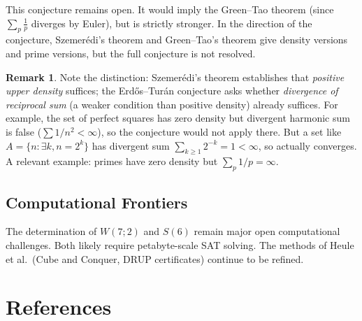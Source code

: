 \documentclass[12pt,a4paper]{amsart}
\theoremstyle{definition}
\newtheorem{remark}[theorem]{Remark}
\begin{document}
This conjecture remains open. It would imply the Green--Tao theorem (since $\sum_{p}
\frac{1}{p}$ diverges by Euler), but is strictly stronger. In the direction of the
conjecture, Szemer\'edi's theorem and Green--Tao's theorem give density versions and
prime versions, but the full conjecture is not resolved.

\begin{remark}
Note the distinction: Szemer\'edi's theorem establishes that \emph{positive upper density}
suffices; the Erd\H{o}s--Tur\'an conjecture asks whether \emph{divergence of reciprocal
sum} (a weaker condition than positive density) already suffices. For example, the set
of perfect squares has zero density but divergent harmonic sum is false
($\sum 1/n^2 < \infty$), so the conjecture would not apply there. But a set like
$A = \{n : \exists k, n = 2^k\}$ has divergent sum $\sum_{k\geq 1} 2^{-k} = 1 < \infty$,
so actually converges. A relevant example: primes have zero density but $\sum_p 1/p = \infty$.
\end{remark}

\subsection{Computational Frontiers}

The determination of $W(7;2)$ and $S(6)$ remain major open computational challenges.
Both likely require petabyte-scale SAT solving. The methods of Heule et al.\
(Cube and Conquer, DRUP certificates) continue to be refined.

\section*{References}
\end{document}
